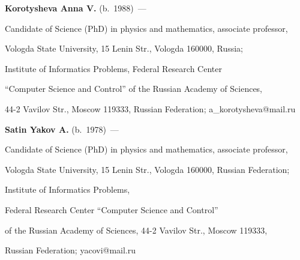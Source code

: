 \textbf{Korotysheva Anna V.} (b.\ 1988)~---

Candidate of Science (PhD) in physics and mathematics, associate professor, 

Vologda State University, 15 Lenin Str., Vologda 160000, Russia; 

Institute of Informatics Problems, Federal Research Center 

``Computer Science and Control'' of the Russian Academy of Sciences, 

44-2 Vavilov Str., Moscow 119333, Russian Federation; a\_korotysheva@mail.ru 







\vspace*{3pt}



\noindent

\textbf{Satin Yakov A.} (b.\ 1978)~---

 Candidate of Science (PhD) in physics and mathematics, associate professor, 

 Vologda State University, 15 Lenin Str., Vologda 160000, Russian Federation; 

 Institute of Informatics Problems,

Federal Research Center ``Computer Science and Control'' 

of the Russian Academy of Sciences, 44-2 Vavilov Str., Moscow 119333, 

Russian Federation; yacovi@mail.ru 



 \label{end\stat}





\renewcommand{\bibname}{\protect\rm Литература}

